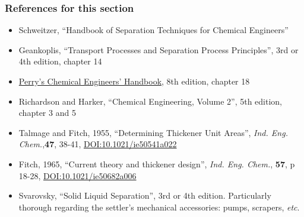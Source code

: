 \begin{frame}\frametitle{References for this section}
	\begin{itemize}
		\item	Schweitzer, ``Handbook of Separation Techniques for Chemical Engineers''%
		\item	Geankoplis, ``Transport Processes and Separation Process Principles'', 3rd or 4th edition, chapter 14
		\item	\href{http://accessengineeringlibrary.com/browse/perrys-chemical-engineers-handbook-eighth-edition}{Perry's Chemical Engineers' Handbook}, 8th edition, chapter 18
		\item	Richardson and Harker, ``Chemical Engineering, Volume 2'', 5th edition, chapter 3 and 5
		\item	Talmage and Fitch, 1955, ``Determining Thickener Unit Areas'', \emph{Ind. Eng. Chem.},\textbf{47}, 38-41, \href{http://dx.doi.org/10.1021/ie50541a022}{\small DOI:10.1021/ie50541a022}
		\item	Fitch, 1965, ``Current theory and thickener design'', \emph{Ind. Eng. Chem.}, \textbf{57}, p 18-28, \href{http://dx.doi.org/10.1021/ie50682a006}{\small DOI:10.1021/ie50682a006}
		\item	Svarovsky, ``Solid Liquid Separation'', 3rd or 4th edition. Particularly thorough regarding the settler's mechanical accessories: pumps, scrapers, \emph{etc}.
	\end{itemize}
\end{frame}
